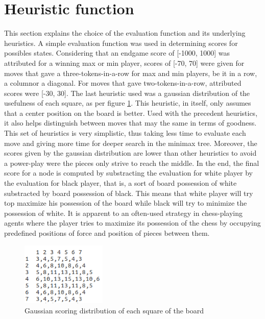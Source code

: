 \documentclass{article}
\begin{document}
\section{Heuristic function}
This section explains the choice of the evaluation function and its underlying heuristics.
A simple evaluation function was used in determining scores for possibles states. Considering that an endgame score of [-1000, 1000] was attributed for a winning max or min player, scores of [-70, 70] were given for moves that gave a three-tokens-in-a-row for max and min players, be it in a row, a columnor a diagonal. For moves that gave two-tokens-in-a-row, attributed scores were [-30, 30]. The last heuristic used was a gaussian distribution of the usefulness of each square, as per figure \ref{fig:gaussian}. This heuristic, in itself, only assumes that a center position on the board is better. Used with the precedent heuristics, it also helps distinguish between moves that may the same in terms of goodness. This set of heuristics is very simplistic, thus taking less time to evaluate each move and giving more time for deeper search in the minimax tree. Moreover, the scores given by the gaussian distribution are lower than other heuristics to avoid a power-play were the pieces only strive to reach the middle. In the end, the final score for a node is computed by substracting the evaluation for white player by the evaluation for black player, that is, a sort of board possession of white substracted by board possession of black. This means that white player will try top maximize his possession of the board while black will try to minimize the possession of white. It is apparent to an often-used strategy in chess-playing agents where the player tries to maximize its possession of the chess by occupying predefined positions of force and position of pieces between them.

	\begin{figure}[!b]
		\hfill\includegraphics[height=3cm]{gauss_distrib.png}\hspace*{\fill}
		\caption{ Gaussian scoring distribution of each square of the board}
		\label{fig:gaussian}
	\end{figure}
\end{document}
